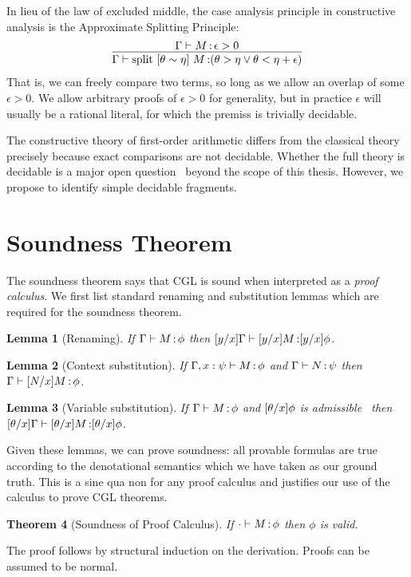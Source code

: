 \documentclass[12pt]{cmuthesis}
\newtheorem{theorem}{Theorem}
\newtheorem{lemma}[theorem]{Lemma}
\theoremstyle{definition}
\theoremstyle{remark}
\newcommand{\CGL}{\textsf{CGL}\xspace}
\newcommand{\G}{\Gamma}
\begin{document}
In lieu of the law of excluded middle, the case analysis principle in constructive analysis is the Approximate Splitting Principle:
\[\infer
  {\proves{\G}{\esplit{\theta}{\eta}{M}}{(\theta > \eta \lor \theta < \eta + \epsilon)}}
  {\proves{\G}{M}{\epsilon > 0}}\]
That is, we can freely compare two terms, so long as we allow an overlap of some $\epsilon > 0$.
We allow arbitrary proofs of $\epsilon > 0$ for generality, but in practice $\epsilon$ will usually be a rational literal, for which the premiss is trivially decidable.

The constructive theory of first-order arithmetic differs from the classical theory precisely because exact comparisons are not decidable.
Whether the full theory is decidable is a major open question~\cite{constructiveRealAlgebra} beyond the scope of this thesis.
However, we propose to identify simple decidable fragments.

\section{Soundness Theorem}
The soundness theorem says that \CGL is sound when interpreted as a \emph{proof calculus}.
We first list standard renaming and substitution lemmas which are required for the soundness theorem.
\begin{lemma}[Renaming]
  If $\proves{\G}{M}{\phi}$ then $\proves{\esub{\G}{x}{y}}{\esub{M}{x}{y}}{\esub{\phi}{x}{y}}$.
\end{lemma}
\begin{lemma}[Context substitution]
  If $\proves{\G,x:\psi}{M}{\phi}$ and $\proves{\G}{N}{\psi}$ then $\proves{\G}{\esub{M}{x}{N}}{\phi}$.
\end{lemma}
\begin{lemma}[Variable substitution]
  If $\proves{\G}{M}{\phi}$ and $[{\theta}/{x}]{\phi}$ is admissible~\cite[Def.\ 6]{DBLP:journals/jar/Platzer08} then $\proves{\esub{\G}{x}{\theta}}{\esub{M}{x}{\theta}}{\esub{\phi}{x}{\theta}}$.
\end{lemma}
Given these lemmas, we can prove soundness: all provable formulas are true according to the denotational semantics which we have taken as our ground truth.
This is a sine qua non for any proof calculus and justifies our use of the calculus to prove \CGL theorems.
\begin{theorem}[Soundness of Proof Calculus]
  If $\cdot\allowbreak\vdash M \allowbreak \mathop{:} \phi$ then $\phi$ is valid.
\end{theorem}
The proof follows by structural induction on the derivation.
Proofs can be assumed to be normal.
\end{document}
